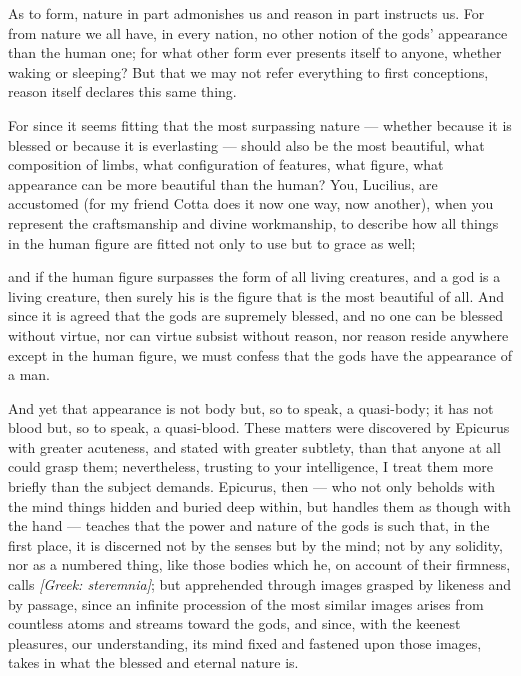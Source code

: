  As to form, nature in part admonishes us and reason in part instructs us. For from nature we all have, in every nation, no other notion of the gods' appearance than the human one; for what other form ever presents itself to anyone, whether waking or sleeping? But that we may not refer everything to first conceptions, reason itself declares this same thing.

 For since it seems fitting that the most surpassing nature — whether because it is blessed or because it is everlasting — should also be the most beautiful, what composition of limbs, what configuration of features, what figure, what appearance can be more beautiful than the human? You, Lucilius, are accustomed (for my friend Cotta does it now one way, now another), when you represent the craftsmanship and divine workmanship, to describe how all things in the human figure are fitted not only to use but to grace as well;

 and if the human figure surpasses the form of all living creatures, and a god is a living creature, then surely his is the figure that is the most beautiful of all. And since it is agreed that the gods are supremely blessed, and no one can be blessed without virtue, nor can virtue subsist without reason, nor reason reside anywhere except in the human figure, we must confess that the gods have the appearance of a man.

 And yet that appearance is not body but, so to speak, a quasi-body; it has not blood but, so to speak, a quasi-blood. These matters were discovered by Epicurus with greater acuteness, and stated with greater subtlety, than that anyone at all could grasp them; nevertheless, trusting to your intelligence, I treat them more briefly than the subject demands. Epicurus, then — who not only beholds with the mind things hidden and buried deep within, but handles them as though with the hand — teaches that the power and nature of the gods is such that, in the first place, it is discerned not by the senses but by the mind; not by any solidity, nor as a numbered thing, like those bodies which he, on account of their firmness, calls \textit{[Greek: steremnia]}; but apprehended through images grasped by likeness and by passage, since an infinite procession of the most similar images arises from countless atoms and streams toward the gods, and since, with the keenest pleasures, our understanding, its mind fixed and fastened upon those images, takes in what the blessed and eternal nature is.


